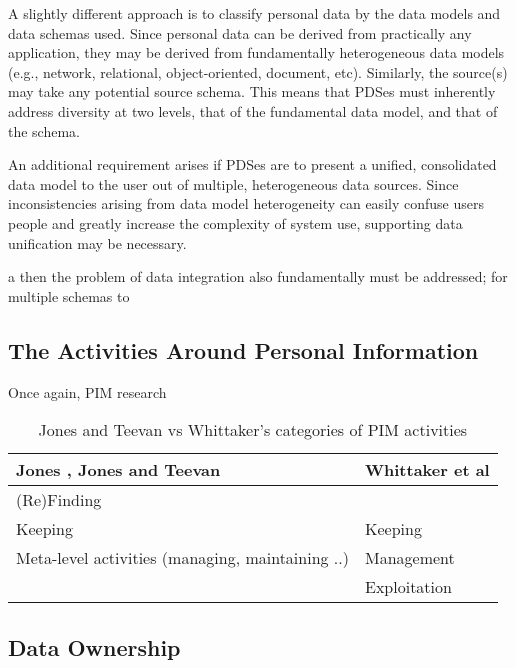 \documentclass[runningheads,a4paper]{llncs}
\begin{document}
A slightly different approach is to classify personal data by the data models and data schemas used.  Since personal data can be derived from practically any application, they may be derived from fundamentally heterogeneous data models (e.g., network, relational, object-oriented, document, etc). Similarly, the source(s) may take any potential source schema.  This means that PDSes must inherently address diversity at two levels, that of the fundamental data model, and that of the schema.

An additional requirement arises if PDSes are to present a unified, consolidated data model to the user out of multiple, heterogeneous data sources. Since inconsistencies arising from data model heterogeneity can easily confuse users people and greatly increase the complexity of system use, supporting data unification may be necessary. 

 a then the problem of data integration also fundamentally must be addressed; for multiple schemas to 




\subsection{The Activities Around Personal Information}

Once again, PIM research 

\begin{table}
\begin{tabular}{p{5cm} p{7cm}} 
Jones \cite{jones}, Jones and Teevan \cite{jonesteevan}& Whittaker et al \cite{whittaker}\\
\hline
(Re)Finding &  \\
Keeping & Keeping \\
Meta-level activities (managing, maintaining ..) & Management \\
 & Exploitation \\
\end{tabular}
\caption{Jones and Teevan vs Whittaker's categories of PIM activities}
\label{fig:pimactivities}
\end{table}

\subsection{Data Ownership}



\end{document}
